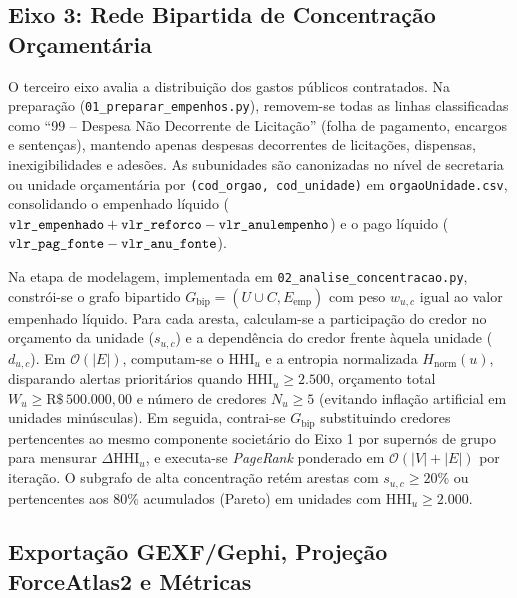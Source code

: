 \subsection{Eixo 3: Rede Bipartida de Concentração Orçamentária}

O terceiro eixo avalia a distribuição dos gastos públicos contratados. Na preparação (\texttt{01\_\allowbreak preparar\_\allowbreak empenhos\allowbreak .py}), removem-se todas as linhas classificadas como ``99 -- Despesa Não Decorrente de Licitação'' (folha de pagamento, encargos e sentenças), mantendo apenas despesas decorrentes de licitações, dispensas, inexigibilidades e adesões. As subunidades são canonizadas no nível de secretaria ou unidade orçamentária por \texttt{(cod\_\allowbreak orgao, cod\_\allowbreak unidade)} em \texttt{orgao\allowbreak Unidade\allowbreak .csv}, consolidando o empenhado líquido ($\texttt{vlr\_\allowbreak empenhado} + \texttt{vlr\_\allowbreak reforco} - \texttt{vlr\_\allowbreak anulempenho}$) e o pago líquido ($\texttt{vlr\_\allowbreak pag\_\allowbreak fonte} - \texttt{vlr\_\allowbreak anu\_\allowbreak fonte}$).

Na etapa de modelagem, implementada em \texttt{02\_\allowbreak analise\_\allowbreak concentracao\allowbreak .py}, constrói-se o grafo bipartido $G_{\text{bip}} = (U \cup C, E_{\text{emp}})$ com peso $w_{u,c}$ igual ao valor empenhado líquido. Para cada aresta, calculam-se a participação do credor no orçamento da unidade ($s_{u,c}$) e a dependência do credor frente àquela unidade ($d_{u,c}$). Em $\mathcal{O}(|E|)$, computam-se o $\text{HHI}_u$ e a entropia normalizada $H_{\text{norm}}(u)$, disparando alertas prioritários quando $\text{HHI}_u \ge 2.500$, orçamento total $W_u \ge \text{R\$}\,500.000{,}00$ e número de credores $N_u \ge 5$ (evitando inflação artificial em unidades minúsculas). Em seguida, contrai-se $G_{\text{bip}}$ substituindo credores pertencentes ao mesmo componente societário do Eixo 1 por supernós de grupo para mensurar $\Delta\text{HHI}_u$, e executa-se \textit{PageRank} ponderado em $\mathcal{O}(|V|+|E|)$ por iteração. O subgrafo de alta concentração retém arestas com $s_{u,c} \ge 20\%$ ou pertencentes aos 80\% acumulados (Pareto) em unidades com $\text{HHI}_u \ge 2.000$.

\subsection{Exportação GEXF/Gephi, Projeção ForceAtlas2 e Métricas}

